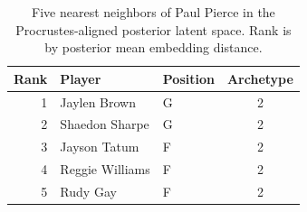 \begin{table}[htbp]
  \centering\small
  \begin{tabular}{rllc}
    \toprule
    Rank & Player & Position & Archetype \\
    \midrule
    1 & Jaylen Brown & G & 2 \\
    2 & Shaedon Sharpe & G & 2 \\
    3 & Jayson Tatum & F & 2 \\
    4 & Reggie Williams & F & 2 \\
    5 & Rudy Gay & F & 2 \\
    \bottomrule
  \end{tabular}
  \caption{Five nearest neighbors of Paul Pierce in the Procrustes-aligned posterior latent space. Rank is by posterior mean embedding distance.}
  \label{tab:Paul_Pierce_neighbors}
\end{table}

